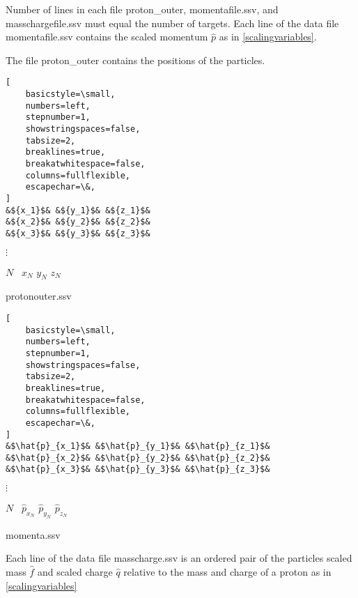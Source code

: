 \documentclass[oneside,12pt]{book}
\begin{document}
Number of lines in each file proton{\_}outer, momentafile.ssv, and masschargefile.ssv must equal the number of targets.  Each line of the data file momentafile.ssv contains the scaled momentum $\hat{p}$ as in \eqref{scalingvariables}.

The file proton{\_}outer contains the positions of the particles.
\begin{datafile}
\begin{lstlisting}[
    basicstyle=\small,
    numbers=left,
    stepnumber=1,
    showstringspaces=false,
    tabsize=2,
    breaklines=true,
    breakatwhitespace=false,
    columns=fullflexible,
    escapechar=\&,    
]
&${x_1}$& &${y_1}$& &${z_1}$&
&${x_2}$& &${y_2}$& &${z_2}$&
&${x_3}$& &${y_3}$& &${z_3}$&
\end{lstlisting}
\vspace*{-1ex}

\hspace*{2ex}$\vdots$

\hspace*{-3.5ex}$N$ \ ${x_N}$ ${y_N}$ ${z_N}$
\caption{protonouter.ssv}
\label{df:protonouter.ssv}
\end{datafile}


\begin{datafile}
\begin{lstlisting}[
    basicstyle=\small,
    numbers=left,
    stepnumber=1,
    showstringspaces=false,
    tabsize=2,
    breaklines=true,
    breakatwhitespace=false,
    columns=fullflexible,
    escapechar=\&,    
]
&$\hat{p}_{x_1}$& &$\hat{p}_{y_1}$& &$\hat{p}_{z_1}$&
&$\hat{p}_{x_2}$& &$\hat{p}_{y_2}$& &$\hat{p}_{z_2}$&
&$\hat{p}_{x_3}$& &$\hat{p}_{y_3}$& &$\hat{p}_{z_3}$&
\end{lstlisting}
\vspace*{-1ex}

\hspace*{4.2ex}$\vdots$

\hspace*{-3.5ex}$N$ \ $\hat{p}_{x_N}$ $\hat{p}_{y_N}$ $\hat{p}_{z_N}$
\caption{momenta.ssv}
\label{df:momenta.ssv}
\end{datafile}

Each line of the data file masscharge.ssv is an ordered pair of the particles scaled mass $\hat{f}$ and scaled charge $\hat{q}$ relative to the mass and charge of a proton as in \eqref{scalingvariables}
\end{document}
